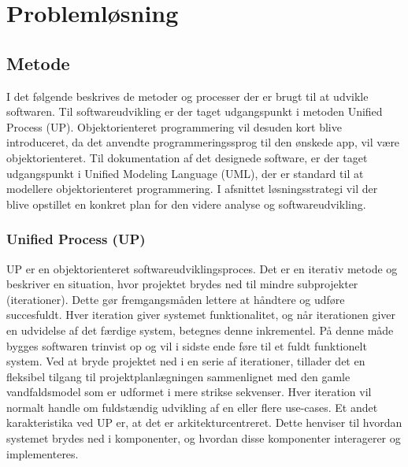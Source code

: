 \chapter{Problemløsning}
\section{Metode}
I det følgende beskrives de metoder og processer der er brugt til at udvikle softwaren. Til softwareudvikling er der taget udgangspunkt i metoden Unified Process (UP). Objektorienteret programmering vil desuden kort blive introduceret, da det anvendte programmeringssprog til den ønskede app, vil være objektorienteret. Til dokumentation af det designede software, er der taget udgangspunkt i Unified Modeling Language (UML), der er standard til at modellere objektorienteret programmering. I afsnittet løsningsstrategi vil der blive opstillet en konkret plan for den videre analyse og softwareudvikling.

\subsection{Unified Process (UP)}
UP er en objektorienteret softwareudviklingsproces. Det er en iterativ metode og beskriver en situation, hvor projektet brydes ned til mindre subprojekter (iterationer). Dette gør fremgangsmåden lettere at håndtere og udføre succesfuldt. Hver iteration giver systemet funktionalitet, og når iterationen giver en udvidelse af det færdige system, betegnes denne inkrementel. På denne måde bygges softwaren trinvist op og vil i sidste ende føre til et fuldt funktionelt system. Ved at bryde projektet ned i en serie af iterationer, tillader det en fleksibel tilgang til projektplanlægningen sammenlignet med den gamle vandfaldsmodel som er udformet i mere strikse sekvenser. Hver iteration vil normalt handle om fuldstændig udvikling af en eller flere use-cases. Et andet karakteristika ved UP er, at det er arkitekturcentreret. Dette henviser til hvordan systemet brydes ned i komponenter, og hvordan disse komponenter interagerer og implementeres.\citep{Arlow2002}
